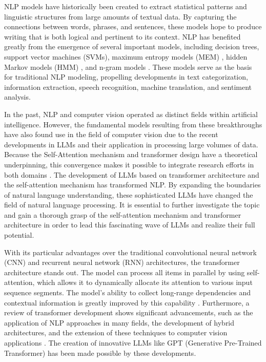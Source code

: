 NLP models have historically been created to extract statistical patterns and linguistic structures from large amounts of textual data. By capturing the connections between words, phrases, and sentences, these models hope to produce writing that is both logical and pertinent to its context. NLP has benefited greatly from the emergence of several important models, including decision trees, support vector machines (SVMs), maximum entropy models (MEM) \cite{berger1996}, hidden Markov models (HMM) \cite{rabiner1989}, and n-gram models \cite{jelinek1980}. These models serve as the basis for traditional NLP modeling, propelling developments in text categorization, information extraction, speech recognition, machine translation, and sentiment analysis.

In the past, NLP and computer vision operated as distinct fields within artificial intelligence. However, the fundamental models resulting from these breakthroughs have also found use in the field of computer vision due to the recent developments in LLMs and their application in processing large volumes of data. Because the Self-Attention mechanism and transformer design have a theoretical underpinning, this convergence makes it possible to integrate research efforts in both domains \cite{Vaswani2017}. The development of LLMs based on transformer architecture and the self-attention mechanism has transformed NLP. By expanding the boundaries of natural language understanding, these sophisticated LLMs have changed the field of natural language processing. It is essential to further investigate the topic and gain a thorough grasp of the self-attention mechanism and transformer architecture in order to lead this fascinating wave of LLMs and realize their full potential.

With its particular advantages over the traditional convolutional neural network (CNN) and recurrent neural network (RNN) architectures, the transformer architecture stands out. The model can process all items in parallel by using self-attention, which allows it to dynamically allocate its attention to various input sequence segments. The model's ability to collect long-range dependencies and contextual information is greatly improved by this capability \cite{Vaswani2017}. Furthermore, a review of transformer development shows significant advancements, such as the application of NLP approaches in many fields, the development of hybrid architectures, and the extension of these techniques to computer vision applications \cite{dosovitskiy2020}. The creation of innovative LLMs like GPT \cite{radford2019} (Generative Pre-Trained Transformer) has been made possible by these developments.

